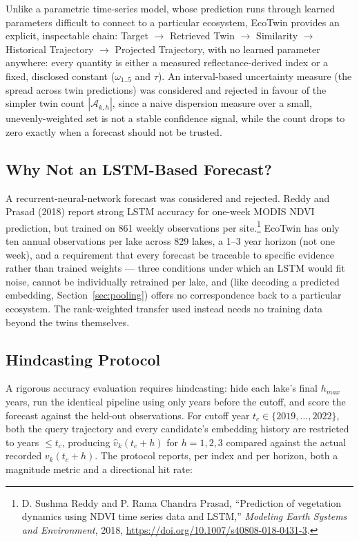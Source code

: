 \documentclass[12pt,a4paper,oneside]{report}
\begin{document}
Unlike a parametric time-series model, whose prediction runs through
learned parameters difficult to connect to a particular ecosystem,
EcoTwin provides an explicit, inspectable chain: Target
$\rightarrow$ Retrieved Twin $\rightarrow$ Similarity $\rightarrow$
Historical Trajectory $\rightarrow$ Projected Trajectory, with no
learned parameter anywhere: every quantity is either a measured
reflectance-derived index or a fixed, disclosed constant
($\omega_{1..5}$ and $\tau$). An interval-based uncertainty measure
(the spread across twin predictions) was considered and rejected in
favour of the simpler twin count $|\mathcal{A}_{k,h}|$, since a naive
dispersion measure over a small, unevenly-weighted set is not a
stable confidence signal, while the count drops to zero exactly when
a forecast should not be trusted.

\subsection{Why Not an LSTM-Based Forecast?}
\label{sec:why_not_lstm}

A recurrent-neural-network forecast was considered and rejected.
Reddy and Prasad (2018) report strong LSTM accuracy for one-week
MODIS NDVI prediction, but trained on 861 weekly observations per
site.\footnote{D. Sushma Reddy and P. Rama Chandra Prasad,
``Prediction of vegetation dynamics using NDVI time series data and
LSTM,'' \emph{Modeling Earth Systems and Environment}, 2018,
\url{https://doi.org/10.1007/s40808-018-0431-3}.} EcoTwin has only
ten annual observations per lake across 829 lakes, a 1--3 year
horizon (not one week), and a requirement that every forecast be
traceable to specific evidence rather than trained weights --- three
conditions under which an LSTM would fit noise, cannot be
individually retrained per lake, and (like decoding a predicted
embedding, Section~\ref{sec:pooling}) offers no correspondence back
to a particular ecosystem. The rank-weighted transfer used instead
needs no training data beyond the twins themselves.

\subsection{Hindcasting Protocol}
\label{sec:hindcast_protocol}

A rigorous accuracy evaluation requires hindcasting: hide each
lake's final $h_{max}$ years, run the identical pipeline using only
years before the cutoff, and score the forecast against the
held-out observations. For cutoff year $t_c \in \{2019,\dots,2022\}$,
both the query trajectory and every candidate's embedding history
are restricted to years $\le t_c$, producing $\hat{v}_k(t_c+h)$ for
$h=1,2,3$ compared against the actual recorded $v_k(t_c+h)$. The
protocol reports, per index and per horizon, both a magnitude metric
and a directional hit rate:
\end{document}
